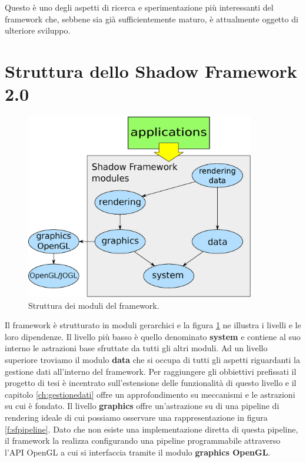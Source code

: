 Questo \`e uno degli aspetti di ricerca e sperimentazione pi\`u interessanti del framework che, sebbene sia gi\`a sufficientemente maturo, \`e attualmente oggetto di ulteriore sviluppo.

\section{Struttura dello Shadow Framework 2.0}
\label{sec:sfstructure}
\begin{figure}
\begin{center}
\includegraphics[width=10cm]{Immagini/sfstructure}
\caption{Struttura dei moduli del framework.\label{f:sfstructure}} 
\end{center} 
\end{figure}
Il framework \`e strutturato in moduli gerarchici e la figura \ref{f:sfstructure} ne illustra i livelli e le loro dipendenze. Il livello pi\`u basso \`e quello denominato \textbf{system} e contiene al suo interno le astrazioni base sfruttate da tutti gli altri moduli. Ad un livello superiore troviamo il modulo \textbf{data} che si occupa di tutti gli aspetti riguardanti la gestione dati all'interno del framework. Per raggiungere gli obbiettivi prefissati il progetto di tesi \`e incentrato sull'estensione delle funzionalit\`a di questo livello e il capitolo \ref{ch:gestionedati} offre un approfondimento su meccanismi e le astrazioni su cui \`e fondato. Il livello \textbf{graphics} offre un'astrazione su di una pipeline di rendering ideale di cui possiamo osservare una rappresentazione in figura \ref{f:sfpipeline}. Dato che non esiste una implementazione diretta di questa pipeline, il framework la realizza configurando una pipeline programmabile attraverso l'\ac{API} OpenGL a cui si interfaccia tramite il modulo \textbf{graphics OpenGL}.
